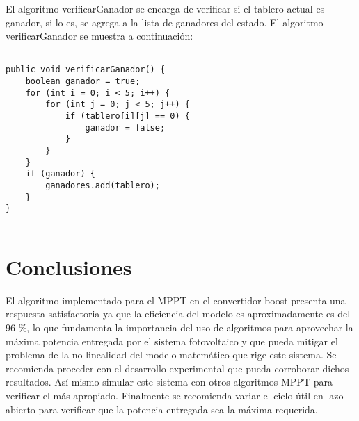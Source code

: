 \documentclass[10pt,twocolumn]{article}
\begin{document}
El algoritmo verificarGanador se encarga de verificar si el tablero actual es ganador, si lo es, se agrega a la lista de ganadores del estado. El algoritmo verificarGanador se muestra a continuación:

\begin{lstlisting}

public void verificarGanador() {
	boolean ganador = true;
	for (int i = 0; i < 5; i++) {
		for (int j = 0; j < 5; j++) {
			if (tablero[i][j] == 0) {
				ganador = false;
			}
		}
	}
	if (ganador) {
		ganadores.add(tablero);
	}
}


\end{lstlisting}
\newpage
\section{Conclusiones}

El algoritmo implementado para el MPPT en el convertidor boost presenta una respuesta satisfactoria ya que la eficiencia del modelo es aproximadamente es del 96 $\%$, lo que fundamenta la importancia del uso de algoritmos para aprovechar la máxima potencia entregada por el sistema fotovoltaico y que pueda mitigar el problema de la no linealidad del modelo matemático que rige este sistema.
Se recomienda proceder con el desarrollo experimental que pueda corroborar dichos resultados. Así mismo simular este sistema con otros algoritmos MPPT para verificar el más apropiado. Finalmente se recomienda variar el ciclo útil en lazo abierto para verificar que la potencia entregada sea la máxima requerida.
\newpage



\end{document}

